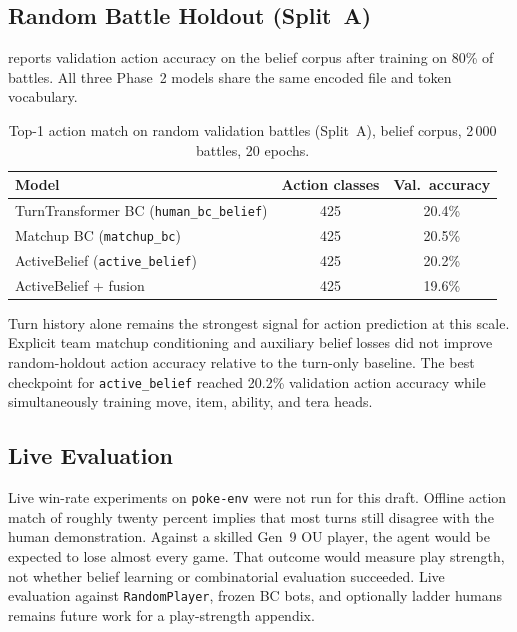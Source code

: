 \subsection{Random Battle Holdout (Split~A)}

 reports validation action accuracy on the belief corpus
after training on 80\% of battles. All three Phase~2 models share the same
encoded file and token vocabulary.

\begin{table}[ht]
  \centering
  \caption{Top-1 action match on random validation battles (Split~A),
    belief corpus, 2\,000 battles, 20 epochs.}
  \label{tab:policy-val}
  \begin{tabular}{lcc}
    \toprule
    Model & Action classes & Val.\ accuracy \\
    \midrule
    TurnTransformer BC (\texttt{human\_bc\_belief}) & 425 & 20.4\% \\
    Matchup BC (\texttt{matchup\_bc}) & 425 & 20.5\% \\
    ActiveBelief (\texttt{active\_belief}) & 425 & 20.2\% \\
    ActiveBelief + fusion & 425 & 19.6\% \\
    \bottomrule
  \end{tabular}
\end{table}

Turn history alone remains the strongest signal for action prediction at this
scale. Explicit team matchup conditioning and auxiliary belief losses did not
improve random-holdout action accuracy relative to the turn-only baseline.
The best checkpoint for \texttt{active\_belief} reached 20.2\% validation
action accuracy while simultaneously training move, item, ability, and tera
heads.

\subsection{Live Evaluation}

Live win-rate experiments on \texttt{poke-env} were not run for this draft.
Offline action match of roughly twenty percent implies that most turns still
disagree with the human demonstration. Against a skilled Gen~9 OU player, the
agent would be expected to lose almost every game. That outcome would measure
play strength, not whether belief learning or combinatorial evaluation succeeded.
Live evaluation against \texttt{RandomPlayer}, frozen BC bots, and optionally
ladder humans remains future work for a play-strength appendix.

